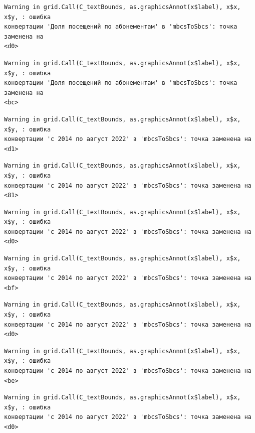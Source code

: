 \documentclass[
  letterpaper,
  DIV=11,
  numbers=noendperiod]{scrreprt}
\begin{document}
\begin{verbatim}
Warning in grid.Call(C_textBounds, as.graphicsAnnot(x$label), x$x, x$y, : ошибка
конвертации 'Доля посещений по абонементам' в 'mbcsToSbcs': точка заменена на
<d0>
\end{verbatim}

\begin{verbatim}
Warning in grid.Call(C_textBounds, as.graphicsAnnot(x$label), x$x, x$y, : ошибка
конвертации 'Доля посещений по абонементам' в 'mbcsToSbcs': точка заменена на
<bc>
\end{verbatim}

\begin{verbatim}
Warning in grid.Call(C_textBounds, as.graphicsAnnot(x$label), x$x, x$y, : ошибка
конвертации 'с 2014 по август 2022' в 'mbcsToSbcs': точка заменена на <d1>
\end{verbatim}

\begin{verbatim}
Warning in grid.Call(C_textBounds, as.graphicsAnnot(x$label), x$x, x$y, : ошибка
конвертации 'с 2014 по август 2022' в 'mbcsToSbcs': точка заменена на <81>
\end{verbatim}

\begin{verbatim}
Warning in grid.Call(C_textBounds, as.graphicsAnnot(x$label), x$x, x$y, : ошибка
конвертации 'с 2014 по август 2022' в 'mbcsToSbcs': точка заменена на <d0>
\end{verbatim}

\begin{verbatim}
Warning in grid.Call(C_textBounds, as.graphicsAnnot(x$label), x$x, x$y, : ошибка
конвертации 'с 2014 по август 2022' в 'mbcsToSbcs': точка заменена на <bf>
\end{verbatim}

\begin{verbatim}
Warning in grid.Call(C_textBounds, as.graphicsAnnot(x$label), x$x, x$y, : ошибка
конвертации 'с 2014 по август 2022' в 'mbcsToSbcs': точка заменена на <d0>
\end{verbatim}

\begin{verbatim}
Warning in grid.Call(C_textBounds, as.graphicsAnnot(x$label), x$x, x$y, : ошибка
конвертации 'с 2014 по август 2022' в 'mbcsToSbcs': точка заменена на <be>
\end{verbatim}

\begin{verbatim}
Warning in grid.Call(C_textBounds, as.graphicsAnnot(x$label), x$x, x$y, : ошибка
конвертации 'с 2014 по август 2022' в 'mbcsToSbcs': точка заменена на <d0>
\end{verbatim}
\end{document}
